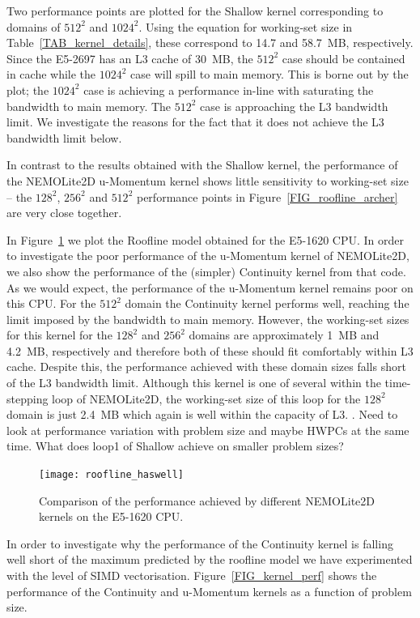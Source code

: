 \documentclass[12pt]{article}
\begin{document}
Two performance points are plotted for the Shallow kernel
corresponding to domains of $512^2$ and $1024^2$. Using the equation
for working-set size in Table~\ref{TAB_kernel_details}, these
correspond to 14.7 and 58.7~MB, respectively. Since the E5-2697 has
an L3 cache of 30~MB, the $512^2$ case should be contained in cache
while the $1024^2$ case will spill to main memory. This is borne out
by the plot; the $1024^2$ case is achieving a performance in-line
with saturating the bandwidth to main memory. The $512^2$ case is
approaching the L3 bandwidth limit. We investigate the reasons for
the fact that it does not achieve the L3 bandwidth limit below.
 
In contrast to the results obtained with the Shallow kernel, the
performance of the NEMOLite2D u-Momentum kernel shows little
sensitivity to working-set size -- the $128^2$, $256^2$ and $512^2$
performance points in Figure~\ref{FIG_roofline_archer} are very close
together.

In Figure~\ref{FIG_roofline_haswell} we plot the Roofline model
obtained for the E5-1620 CPU. In order to investigate the poor
performance of the u-Momentum kernel of NEMOLite2D, we also show the
performance of the (simpler) Continuity kernel from that code. As we
would expect, the performance of the u-Momentum kernel remains poor on
this CPU. For the $512^2$ domain the Continuity kernel performs well,
reaching the limit imposed by the bandwidth to main memory. However,
the working-set sizes for this kernel for the $128^2$ and $256^2$
domains are approximately 1~MB and 4.2~MB, respectively and therefore
both of these should fit comfortably within L3 cache. Despite this,
the performance achieved with these domain sizes falls short of the L3
bandwidth limit.  Although this kernel is one of several within the
time-stepping loop of NEMOLite2D, the working-set size of this loop
for the $128^2$ domain is just 2.4~MB which again is well within the
capacity of L3.  . Need to look at performance variation with problem
size and maybe HWPCs at the same time.  What does loop1 of Shallow
achieve on smaller problem sizes?

\begin{figure}
\centering
\texttt{[image: roofline\_haswell]}
\caption{Comparison of the performance achieved by different
  NEMOLite2D kernels on the E5-1620 CPU.}
\label{FIG_roofline_haswell}
\end{figure}

In order to investigate why the performance of the Continuity kernel
is falling well short of the maximum predicted by the roofline model
we have experimented with the level of SIMD
vectorisation. Figure~\ref{FIG_kernel_perf} shows the performance of
the Continuity and u-Momentum kernels as a function of problem size.
\end{document}
